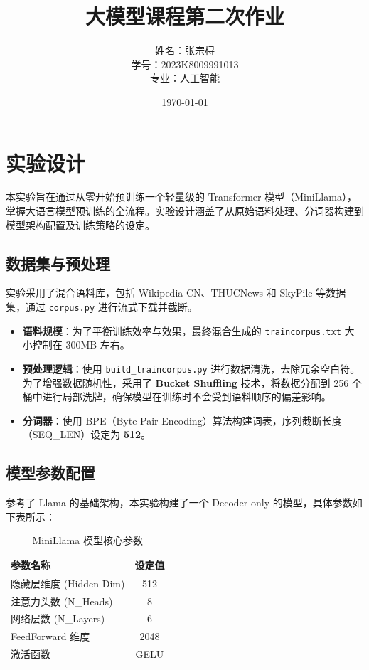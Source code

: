 \documentclass[a4paper,12pt]{ctexart} %
\title{\textbf{大模型课程第二次作业}}
\author{姓名：张宗桪 \\ 学号：2023K8009991013 \\ 专业：人工智能}
\date{\today}
\begin{document}
\pagestyle{plain} %

\maketitle
\thispagestyle{empty} %
\newpage

\tableofcontents
\newpage
\section{实验设计}

本实验旨在通过从零开始预训练一个轻量级的 Transformer 模型（MiniLlama），掌握大语言模型预训练的全流程。实验设计涵盖了从原始语料处理、分词器构建到模型架构配置及训练策略的设定。

\subsection{数据集与预处理}
实验采用了混合语料库，包括 Wikipedia-CN、THUCNews 和 SkyPile 等数据集，通过 \texttt{corpus.py} 进行流式下载并截断。
\begin{itemize}
    \item \textbf{语料规模}：为了平衡训练效率与效果，最终混合生成的 \texttt{traincorpus.txt} 大小控制在 300MB 左右。
    \item \textbf{预处理逻辑}：使用 \texttt{build\_traincorpus.py} 进行数据清洗，去除冗余空白符。为了增强数据随机性，采用了 \textbf{Bucket Shuffling} 技术，将数据分配到 256 个桶中进行局部洗牌，确保模型在训练时不会受到语料顺序的偏差影响。
    \item \textbf{分词器}：使用 BPE（Byte Pair Encoding）算法构建词表，序列截断长度（SEQ\_LEN）设定为 \textbf{512}。
\end{itemize}

\subsection{模型参数配置}
参考了 Llama 的基础架构，本实验构建了一个 Decoder-only 的模型，具体参数如下表所示：

\begin{table}[H]
    \centering
    \caption{MiniLlama 模型核心参数}
    \begin{tabular}{lc}
        \toprule
        参数名称 & 设定值 \\
        \midrule
        隐藏层维度 (Hidden Dim) & 512 \\
        注意力头数 (N\_Heads) & 8 \\
        网络层数 (N\_Layers) & 6 \\
        FeedForward 维度 & 2048 \\
        激活函数 & GELU \\
        \bottomrule
    \end{tabular}
\end{table}
\end{document}
